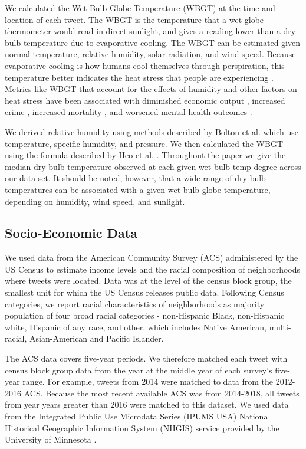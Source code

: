 \documentclass[titlepage]{article}
\begin{document}
We calculated the Wet Bulb Globe Temperature (WBGT) at the time and location of each tweet. The WBGT is the temperature that a wet globe thermometer would read in direct sunlight, and gives a reading lower than a dry bulb temperature due to evaporative cooling. The WBGT can be estimated given normal temperature, relative humidity, solar radiation, and wind speed. Because evaporative cooling is how humans cool themselves through perspiration, this temperature better indicates the heat stress that people are experiencing \citep{budd2008wet}. Metrics like WBGT that account for the effects of humidity and other factors on heat stress have been associated with diminished economic output \citep{rao2020projections}, increased crime \citep{hu2017impact}, increased mortality \citep{chien2016spatiotemporal, armstrong2019role}, and worsened mental health outcomes \citep{vida2012relationship, ding2016importance}.

We derived relative humidity using methods described by Bolton et al. \citep{bolton_computation_1980} which use temperature, specific humidity, and pressure. We then calculated the WBGT using the formula described by Heo et al. \citep{heo2019comparison}.  Throughout the paper we give the median dry bulb temperature observed at each given wet bulb temp degree across our data set. It should be noted, however, that a wide range of dry bulb temperatures can be associated with a given wet bulb globe temperature, depending on humidity, wind speed, and sunlight.

\subsection*{Socio-Economic Data}
We used data from the American Community Survey (ACS) administered by the US Census to estimate income levels and the racial composition of neighborhoods where tweets were located. Data was at the level of the census block group, the smallest unit for which the US Census releases public data. Following Census categories, we report racial characteristics of neighborhoods as majority population of four broad racial categories - non-Hispanic Black, non-Hispanic white, Hispanic of any race, and other, which includes Native American, multi-racial, Asian-American and Pacific Islander. 

The ACS data covers five-year periods. We therefore matched each tweet with census block group data from the year at the middle year of each survey's five-year range. For example, tweets from 2014 were matched to data from the 2012-2016 ACS. Because the most recent available ACS was from 2014-2018, all tweets from year years greater than 2016 were matched to this dataset. We used data from the Integrated Public Use Microdata Series (IPUMS USA) National Historical Geographic Information System (NHGIS) service provided by the University of Minnesota \citep{ruggles2018ipums}.
\end{document}
